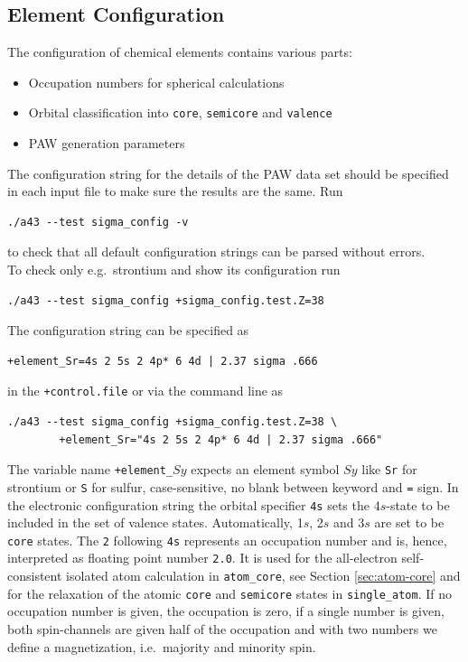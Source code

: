 \documentclass[oribibl]{llncs}
\newcommand{\ttt}[1]{\texttt{#1}}
\begin{document}
\subsection{Element Configuration} \label{sec:sigma-config}
%
The configuration of chemical elements contains various parts:
\begin{itemize}
  \item Occupation numbers for spherical calculations
  \item Orbital classification into \ttt{core}, \ttt{semicore} and \ttt{valence}
  \item \ac{PAW} generation parameters
\end{itemize}
%
\noindent
The configuration string for the details of the \ac{PAW} data set should be 
specified in each input file to make sure the results are the same. Run
\begin{verbatim}
./a43 --test sigma_config -v
\end{verbatim}
to check that all default configuration strings can be parsed without errors.
\\
To check only e.g.~strontium and show its configuration run
\begin{verbatim}
./a43 --test sigma_config +sigma_config.test.Z=38
\end{verbatim}
The configuration string can be specified as
\begin{verbatim}
+element_Sr=4s 2 5s 2 4p* 6 4d | 2.37 sigma .666
\end{verbatim}
in the \ttt{+control.file} or via the command line as
\begin{verbatim}
./a43 --test sigma_config +sigma_config.test.Z=38 \
        +element_Sr="4s 2 5s 2 4p* 6 4d | 2.37 sigma .666"
\end{verbatim}
The variable name \ttt{+element\_}$Sy$ expects an element symbol $Sy$ 
like \ttt{Sr} for strontium or \ttt{S} for sulfur, case-sensitive, no blank between keyword and \ttt{=} sign.
In the electronic configuration string the orbital specifier \ttt{4s} sets the 4$s$-state to be 
included in the set of valence states. Automatically, 1$s$, 2$s$ and 3$s$ are set to 
be \ttt{core} states.
The \ttt{2} following \ttt{4s} represents an occupation number
and is, hence, interpreted as floating point number \ttt{2.0}.
It is used for the all-electron self-consistent isolated atom calculation in \ttt{atom\_core}, see Section \ref{sec:atom-core}
and for the relaxation of the atomic \ttt{core} and \ttt{semicore} states in \ttt{single\_atom}.
If no occupation number is given, the occupation is zero, if a single number is given,
both spin-channels are given half of the occupation and with two numbers
we define a magnetization, i.e.~majority and minority spin.
\end{document}
